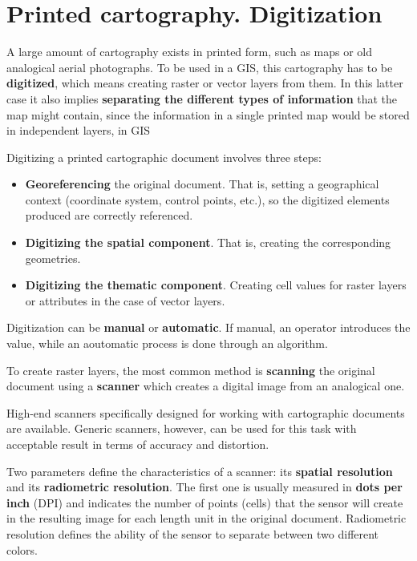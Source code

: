 \section{Printed cartography. Digitization}

A large amount of cartography exists in printed form, such as maps or old analogical aerial photographs. To be used in a GIS, this cartography has to be \textbf{digitized}, which means creating raster or vector layers from them. In this latter case it also implies \textbf{separating the different types of information} that the map might contain, since the information in a single printed map would be stored in independent layers, in GIS

Digitizing a printed cartographic document involves three steps: 

\begin{itemize}
\item \textbf{Georeferencing} the original document. That is, setting a geographical context (coordinate system, control points, etc.), so the digitized elements produced are correctly referenced.
\item \textbf{Digitizing the spatial component}. That is, creating the corresponding geometries.
\item \textbf{Digitizing the thematic component}. Creating cell values for raster layers or attributes in the case of vector layers.
\end{itemize}

Digitization can be \textbf{manual} or \textbf{automatic}. If manual, an operator introduces the value, while an aoutomatic process is done through an algorithm.

To create raster layers, the most common method is \textbf{scanning} the original document using a \textbf{scanner} which creates a digital image from an analogical one.

High-end scanners specifically designed for working with cartographic documents are available. Generic scanners, however, can be used for this task with acceptable result in terms of accuracy and distortion. 

Two parameters define the characteristics of a scanner: its \textbf{spatial resolution} and its \textbf{radiometric resolution}. The first one is usually measured in \textbf{dots per inch} (DPI) and indicates the number of points (cells) that the sensor will create in the resulting image for each length unit in the original document. Radiometric resolution defines the ability of the sensor to separate between two different colors.

